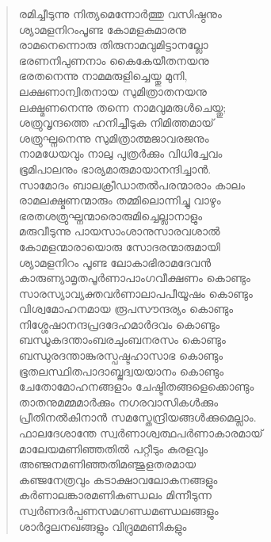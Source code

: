 \begin{verse}
രമിച്ചീടുന്നു നിത്യമെന്നോര്‍ത്തു വസിഷ്ഠനും\\
ശ്യാമളനിറംപൂണ്ട കോമളകുമാരനു\\
രാമനെന്നൊരു തിരുനാമവുമിട്ടാനല്ലോ\\
ഭരണനിപുണനാം കൈകേയീതനയനു\\
ഭരതനെന്നു നാമമരുളിച്ചെയ്തു മുനി,\\
ലക്ഷണാന്വിതനായ സുമിത്രാതനയനു\\
ലക്ഷ്മണനെന്നു തന്നെ നാമവുമരുള്‍ചെയ്തു;\\
ശത്രുവൃന്ദത്തെ ഹനിച്ചീടുക നിമിത്തമായ്\\
ശത്രുഘ്നനെന്നു സുമിത്രാത്മജാവരജനും\\
നാമധേയവും നാലു പുത്രര്‍ക്കും വിധിച്ചേവം\\
ഭൂമിപാലനും ഭാര്യമാരുമായാനന്ദിച്ചാന്‍.\\
സാമോദം ബാലക്രീഡാതല്‍പരന്മാരാം കാലം\\
രാമലക്ഷ്മണന്മാരും തമ്മിലൊന്നിച്ചു വാഴും\\
ഭരതശത്രുഘ്നന്മാരൊരുമിച്ചെല്ലാനാളും\\
മരുവീടുന്നു പായസാംശാനുസാരവശാല്‍\\
കോമളന്മാരായൊരു സോദരന്മാരുമായി\\
ശ്യാമളനിറം പൂണ്ട ലോകാഭിരാമദേവന്‍\\
കാരുണ്യാമൃതപൂര്‍ണാപാംഗവീക്ഷണം കൊണ്ടും\\
സാരസ്യാവ്യക്തവര്‍ണാലാപപീയൂഷം കൊണ്ടും\\
വിശ്വമോഹനമായ രൂപസൗന്ദര്യം കൊണ്ടും\\
നിശ്ശേഷാനന്ദപ്രദദേഹമാര്‍ദവം കൊണ്ടും\\
ബന്ധൂകദന്താംബരചുംബനരസം കൊണ്ടും\\
ബന്ധുരദന്താങ്കുരസ്പഷ്ടഹാസാഭ കൊണ്ടും\\
ഭൂതലസ്ഥിതപാദാബ്ജദ്വയയാനം കൊണ്ടും\\
ചേതോമോഹനങ്ങളാം ചേഷ്ടിതങ്ങളെക്കൊണ്ടും\\
താതനുമമ്മമാര്‍ക്കും നഗരവാസികള്‍ക്കും\\
പ്രീതിനല്‍കിനാന്‍ സമസ്തേന്ദ്രിയങ്ങള്‍ക്കുമെല്ലാം.\\
ഫാലദേശാന്തേ സ്വര്‍ണാശ്വത്ഥപര്‍ണാകാരമായ്\\
മാലേയമണിഞ്ഞതില്‍ പറ്റീടും കുരളവും\\
അഞ്ജനമണിഞ്ഞതിമഞ്ജുളതരമായ\\
കഞ്ജനേത്രവും കടാക്ഷാവലോകനങ്ങളും\\
കര്‍ണാലങ്കാരമണികുണ്ഡലം മിന്നീടുന്ന\\
സ്വര്‍ണദര്‍പ്പണസമഗണ്ഡമണ്ഡലങ്ങളും\\
ശാര്‍ദൂലനഖങ്ങളും വിദ്രുമമണികളും\\

\end{verse}
